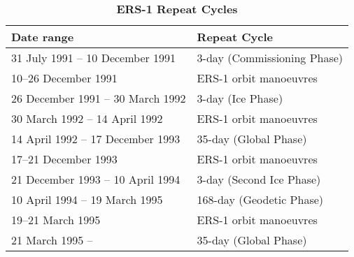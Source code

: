 \begin{table}
\caption{\bf ERS-1 Repeat Cycles }
\label{tab:cycles}
\begin{center}
\begin{tabular}{|l|l|} \hline
{\bf Date range}                     & {\bf Repeat Cycle} \\ \hline \hline
31 July 1991 -- 10 December 1991     & 3-day (Commissioning Phase)\\
10--26 December 1991                 & ERS-1 orbit manoeuvres \\
26 December 1991 -- 30 March 1992    & 3-day (Ice Phase)\\
30 March 1992  -- 14 April 1992      & ERS-1 orbit manoeuvres \\
14 April 1992 -- 17 December 1993    & 35-day (Global Phase) \\ 
17--21 December 1993                 & ERS-1 orbit manoeuvres \\
21 December 1993 -- 10 April 1994    & 3-day (Second Ice Phase) \\
10 April 1994 -- 19 March 1995       & 168-day (Geodetic Phase) \\ 
19--21 March 1995                    & ERS-1 orbit manoeuvres \\
21 March 1995 --                     & 35-day (Global Phase)\\ \hline
\end{tabular}
\end{center}
\end{table}

\clearpage




